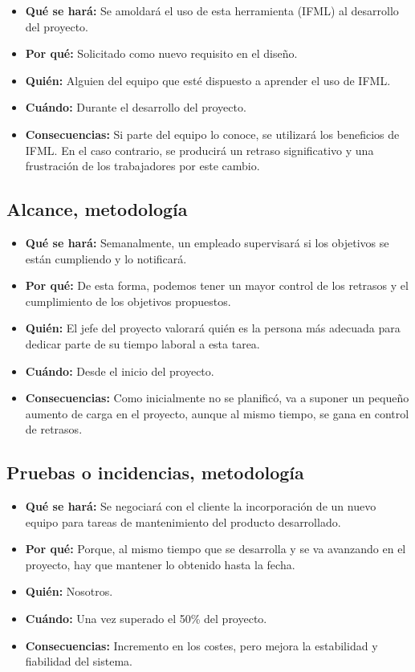 \begin{itemize}
	\item \textbf{Qué se hará: } Se amoldará el uso de esta herramienta (IFML) al desarrollo del proyecto.
	\item \textbf{Por qué: } Solicitado como nuevo requisito en el diseño.
	\item \textbf{Quién: } Alguien del equipo que esté dispuesto a aprender el uso de IFML.
	\item \textbf{Cuándo: } Durante el desarrollo del proyecto.
	\item \textbf{Consecuencias: } Si parte del equipo lo conoce, se utilizará los beneficios de IFML. En el caso contrario, se producirá un retraso significativo y una frustración de los trabajadores por este cambio.
\end{itemize}

\subsection{Alcance, metodología}

\begin{itemize}
	\item \textbf{Qué se hará: } Semanalmente, un empleado supervisará si los objetivos se están cumpliendo y lo notificará.
	\item \textbf{Por qué: } De esta forma, podemos tener un mayor control de los retrasos y el cumplimiento de los objetivos propuestos.
	\item \textbf{Quién: } El jefe del proyecto valorará quién es la persona más adecuada para dedicar parte de su tiempo laboral a esta tarea.
	\item \textbf{Cuándo: } Desde el inicio del proyecto.
	\item \textbf{Consecuencias: } Como inicialmente no se planificó, va a suponer un pequeño aumento de carga en el proyecto, aunque al mismo tiempo, se gana en control de retrasos.
\end{itemize}

\subsection{Pruebas o incidencias, metodología}

\begin{itemize}
	\item \textbf{Qué se hará: } Se negociará con el cliente la incorporación de un nuevo equipo para tareas de mantenimiento del producto desarrollado.
	\item \textbf{Por qué: } Porque, al mismo tiempo que se desarrolla y se va avanzando en el proyecto, hay que mantener lo obtenido hasta la fecha.
	\item \textbf{Quién: } Nosotros.
	\item \textbf{Cuándo: } Una vez superado el 50\% del proyecto.
	\item \textbf{Consecuencias: } Incremento en los costes, pero mejora la estabilidad y fiabilidad del sistema.
\end{itemize}




%
%

       
